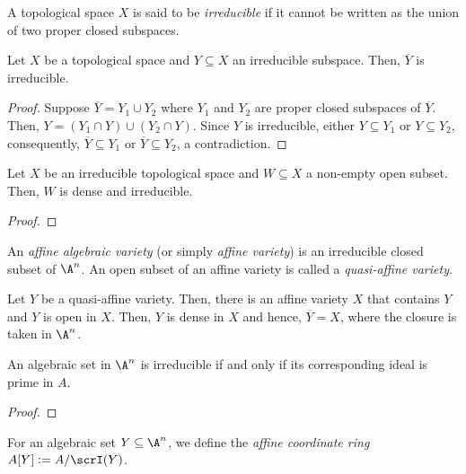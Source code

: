 \begin{definition}[Irreducible]
    A topological space $X$ is said to be \emph{irreducible} if it cannot be written as the union of two proper closed subspaces.
\end{definition}

\begin{proposition}
    Let $X$ be a topological space and $Y\subseteq X$ an irreducible subspace. Then, $\overline Y$ is irreducible.
\end{proposition}
\begin{proof}
    Suppose $\overline Y = Y_1\cup Y_2$ where $Y_1$ and $Y_2$ are proper closed subspaces of $\overline Y$. Then, $Y = (Y_1\cap Y)\cup(Y_2\cap Y)$. Since $Y$ is irreducible, either $Y\subseteq Y_1$ or $Y\subseteq Y_2$, consequently, $\overline Y\subseteq Y_1$ or $\overline Y\subseteq Y_2$, a contradiction.
\end{proof}

\begin{proposition}
    Let $X$ be an irreducible topological space and $W\subseteq X$ a non-empty open subset. Then, $W$ is dense and irreducible.
\end{proposition}
\begin{proof}

\end{proof}

\begin{definition}
    An \emph{affine algebraic variety} (or simply \emph{affine variety}) is an irreducible closed subset of $\A^n$. An open subset of an affine variety is called a \emph{quasi-affine variety}.
\end{definition}

\begin{remark}
    Let $Y$ be a quasi-affine variety. Then, there is an affine variety $X$ that contains $Y$ and $Y$ is open in $X$. Then, $Y$ is dense in $X$ and hence, $\overline Y = X$, where the closure is taken in $\A^n$.
\end{remark}

\begin{proposition}
    An algebraic set in $\A^n$ is irreducible if and only if its corresponding ideal is prime in $A$.
\end{proposition}
\begin{proof}
\end{proof}

\begin{definition}
    For an algebraic set $Y\subseteq\A^n$, we define the \emph{affine coordinate ring} $A[Y] := A/\scrI(Y)$. 
\end{definition}

